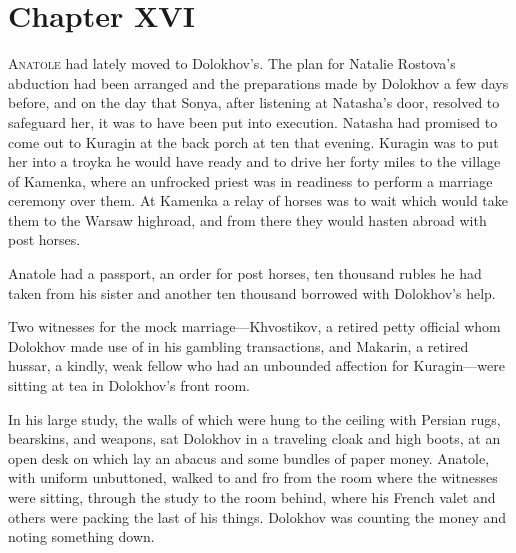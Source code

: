 
\chapter*{Chapter XVI}
\ifaudio     
{} 
\fi

\lettrine[lines=2, loversize=0.3, lraise=0]{\initfamily A}{natole}
had lately moved to Dolokhov's. The plan for Natalie
Rostova's abduction had been arranged and the preparations made
by Dolokhov a few days before, and on the day that Sonya, after
listening at Natasha's door, resolved to safeguard her, it was to
have been put into execution.  Natasha had promised to come out
to Kuragin at the back porch at ten that evening. Kuragin was to
put her into a troyka he would have ready and to drive her forty
miles to the village of Kamenka, where an unfrocked priest was in
readiness to perform a marriage ceremony over them. At Kamenka a
relay of horses was to wait which would take them to the Warsaw
highroad, and from there they would hasten abroad with post
horses.

Anatole had a passport, an order for post horses, ten thousand
rubles he had taken from his sister and another ten thousand
borrowed with Dolokhov's help.

Two witnesses for the mock marriage---Khvostikov, a retired petty
official whom Dolokhov made use of in his gambling transactions,
and Makarin, a retired hussar, a kindly, weak fellow who had an
unbounded affection for Kuragin---were sitting at tea in
Dolokhov's front room.

In his large study, the walls of which were hung to the ceiling
with Persian rugs, bearskins, and weapons, sat Dolokhov in a
traveling cloak and high boots, at an open desk on which lay an
abacus and some bundles of paper money. Anatole, with uniform
unbuttoned, walked to and fro from the room where the witnesses
were sitting, through the study to the room behind, where his
French valet and others were packing the last of his
things. Dolokhov was counting the money and noting something
down.

